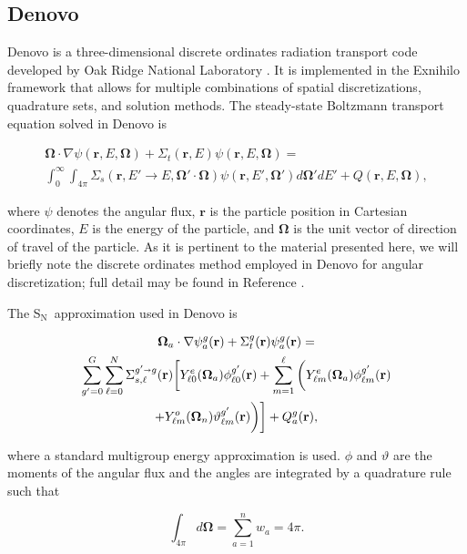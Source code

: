 \documentclass{article} %
\newcommand{\sa}{\shortrightarrow}
\newcommand{\bo}{\mathbf\Omega}
\newcommand{\vecr}{\textbf{r}}
\newcommand{\sn}{S$_\mathrm{N}$}
\newcommand{\Ye}[2]{\ensuremath{Y^e_{#1}(\bo_#2)}}
\newcommand{\Yo}[2]{\ensuremath{Y^o_{#1}(\bo_#2)}}
\begin{document}
\subsection{Denovo}

Denovo is a three-dimensional discrete ordinates radiation transport code
developed by Oak Ridge National Laboratory \cite{denovo}. It is implemented in
the Exnihilo framework that allows for multiple combinations of spatial
discretizations, quadrature sets, and solution methods. The steady-state
Boltzmann transport equation solved in Denovo is

\begin{multline}
\bo \cdot \nabla \psi(\vecr,E,\bo) + \Sigma_t(\vecr,E) \psi(\vecr,E,\bo) = \\
\int_0^\infty\int_{4\pi} \Sigma_s(\vecr,E'\rightarrow E,\bo'\cdot\bo)
\psi(\vecr,E',\bo')d\bo'dE' + Q(\vecr,E,\bo),
\label{eq:bte}
\end{multline}

\noindent where $\psi$ denotes the angular flux, $\vecr$ is the particle
position in Cartesian coordinates, $E$ is the energy of the particle,
and $\bo$ is the unit vector of direction of travel of the particle. As it is
pertinent to the material presented here, we will briefly note the discrete
ordinates method employed in Denovo for angular discretization; full detail may
be found in Reference \cite{denovo}.

The \sn\ approximation used in Denovo is

\begin{multline}
\bo_a \cdot \nabla \psi_a^g(\vecr) + \Sigma_t^g(\vecr)\psi_a^g(\vecr) = \\
\sum_{g'=0}^{G}\sum_{\ell=0}^{N}\Sigma_{s,\ell}^{g'\sa g}(\vecr)
\bigg[\Ye{\ell 0}{a}\phi_{\ell 0}^{g'}(\vecr) + \sum_{m=1}^{\ell}
\bigg(\Ye{\ell m}{a}\phi_{\ell m}^{g'}(\vecr) \\
 + \Yo{\ell m}{n}\vartheta_{\ell m}^{g'}(\vecr)\bigg)\bigg]
+ Q_a^g(\vecr),
\label{eq:sn}
\end{multline}

\noindent where a standard multigroup energy approximation is used. $\phi$ and
$\vartheta$ are the moments of the angular flux and the angles are integrated
by a quadrature rule such that

\begin{equation}
\int_{4\pi} d\bo = \sum_{a=1}^{n}w_a = 4\pi.
\label{eq:quadrule}
\end{equation}
\end{document}
